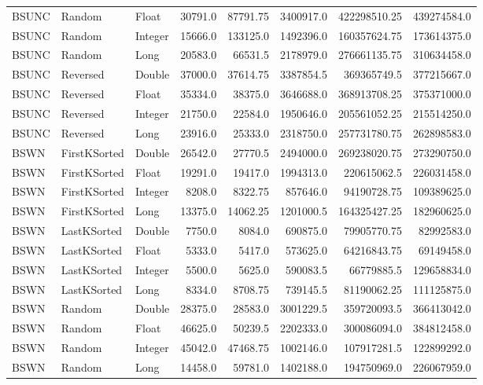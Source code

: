 \documentclass[unicode,11pt,a4paper,oneside,numbers=endperiod,openany]{scrartcl}
\begin{document}
\begin{center}
\begin{longtable}{|l|l|l|r|r|r|r|r|}
            BSUNC & Random & Float & 30791.0 & 87791.75 & 3400917.0 & 422298510.25 & 439274584.0 \\
            BSUNC & Random & Integer & 15666.0 & 133125.0 & 1492396.0 & 160357624.75 & 173614375.0 \\
            BSUNC & Random & Long & 20583.0 & 66531.5 & 2178979.0 & 276661135.75 & 310634458.0 \\
            BSUNC & Reversed & Double & 37000.0 & 37614.75 & 3387854.5 & 369365749.5 & 377215667.0 \\
            BSUNC & Reversed & Float & 35334.0 & 38375.0 & 3646688.0 & 368913708.25 & 375371000.0 \\
            BSUNC & Reversed & Integer & 21750.0 & 22584.0 & 1950646.0 & 205561052.25 & 215514250.0 \\
            BSUNC & Reversed & Long & 23916.0 & 25333.0 & 2318750.0 & 257731780.75 & 262898583.0 \\
            BSWN & FirstKSorted & Double & 26542.0 & 27770.5 & 2494000.0 & 269238020.75 & 273290750.0 \\
            BSWN & FirstKSorted & Float & 19291.0 & 19417.0 & 1994313.0 & 220615062.5 & 226031458.0 \\
            BSWN & FirstKSorted & Integer & 8208.0 & 8322.75 & 857646.0 & 94190728.75 & 109389625.0 \\
            BSWN & FirstKSorted & Long & 13375.0 & 14062.25 & 1201000.5 & 164325427.25 & 182960625.0 \\
            BSWN & LastKSorted & Double & 7750.0 & 8084.0 & 690875.0 & 79905770.75 & 82992583.0 \\
            BSWN & LastKSorted & Float & 5333.0 & 5417.0 & 573625.0 & 64216843.75 & 69149458.0 \\
            BSWN & LastKSorted & Integer & 5500.0 & 5625.0 & 590083.5 & 66779885.5 & 129658834.0 \\
            BSWN & LastKSorted & Long & 8334.0 & 8708.75 & 739145.5 & 81190062.25 & 111125875.0 \\
            BSWN & Random & Double & 28375.0 & 28583.0 & 3001229.5 & 359720093.5 & 366413042.0 \\
            BSWN & Random & Float & 46625.0 & 50239.5 & 2202333.0 & 300086094.0 & 384812458.0 \\
            BSWN & Random & Integer & 45042.0 & 47468.75 & 1002146.0 & 107917281.5 & 122899292.0 \\
            BSWN & Random & Long & 14458.0 & 59781.0 & 1402188.0 & 194750969.0 & 226067959.0 \\

\end{longtable}
\end{center}
\end{document}
